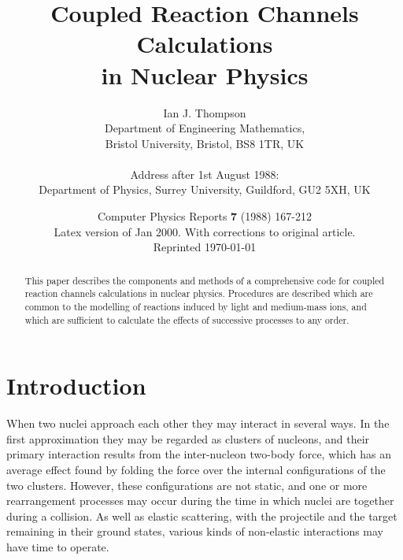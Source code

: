 \documentclass[11pt,a4paper]{article}
\begin{document}
\title{\bf Coupled Reaction Channels Calculations\\
in Nuclear Physics}

\author{Ian J. Thompson\\
%
Department of Engineering Mathematics,\\
Bristol University, Bristol, BS8 1TR, UK\\
~\\
Address after 1st August 1988:\\
%
Department of Physics, Surrey University, Guildford, GU2 5XH, UK}

\date{Computer Physics Reports {\bf 7} (1988) 167-212 \\
        Latex version of Jan 2000. With corrections to original article. \\
        Reprinted \today   }
\maketitle
\begin{abstract}
This paper describes the components and methods of a comprehensive
code for coupled reaction channels calculations in nuclear physics.
Procedures are described which are common to the modelling of reactions
induced by light and medium-mass ions, and which are sufficient to
calculate the effects of successive processes to any order.
\end{abstract}

\section{Introduction}

When two nuclei approach each other
they may interact in several ways.
In the first approximation they may be regarded as clusters of nucleons,
and their primary interaction results from the inter-nucleon two-body force,
which has an
average effect found by folding the force over the internal configurations
of the two clusters.
However, these configurations are not static, and
one or more rearrangement processes may occur during the
time in which nuclei are together during a collision.
As well as elastic scattering, with the projectile and the target
remaining in their ground states,
various kinds of non-elastic interactions may have time to operate.
\end{document}
